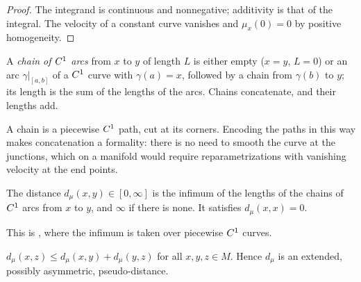 \begin{proof}
  \leanok
  The integrand is continuous and nonnegative; additivity is that of the integral. The velocity
  of a constant curve vanishes and $\mu_x(0) = 0$ by positive homogeneity.
\end{proof}

\begin{definition}
  \label{def:mt-chain}
  \leanok
  A \emph{chain of $C^{1}$ arcs} from $x$ to $y$ of length $L$ is either empty ($x = y$, $L = 0$)
  or an arc $\gamma|_{[a, b]}$ of a $C^{1}$ curve with $\gamma(a) = x$, followed by a chain from
  $\gamma(b)$ to $y$; its length is the sum of the lengths of the arcs. Chains concatenate, and
  their lengths add.
\end{definition}

A chain is a piecewise $C^{1}$ path, cut at its corners. Encoding the paths in this way makes
concatenation a formality: there is no need to smooth the curve at the junctions, which on a
manifold would require reparametrizations with vanishing velocity at the end points.

\begin{definition}
  \label{def:mt-dist}
  \leanok
  The distance $d_\mu(x, y) \in [0, \infty]$ is the infimum of the lengths of the chains of
  $C^{1}$ arcs from $x$ to $y$, and $\infty$ if there is none. It satisfies $d_\mu(x, x) = 0$.
\end{definition}

This is \cite[Def.~2.7]{Lar19}, where the infimum is taken over piecewise $C^{1}$ curves.

\begin{theorem}
  \label{thm:mt-triangle}
  \leanok
  $d_\mu(x, z) \leq d_\mu(x, y) + d_\mu(y, z)$ for all $x, y, z \in M$. Hence $d_\mu$ is an
  extended, possibly asymmetric, pseudo-distance.
\end{theorem}

